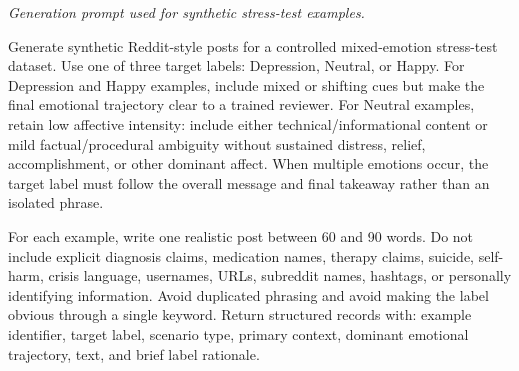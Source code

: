 \documentclass{ieeeaccess}
\begin{document}
\noindent\small\textit{Generation prompt used for synthetic stress-test examples.}\normalsize\par
\smallskip
\noindent
\begingroup\small
Generate synthetic Reddit-style posts for a controlled mixed-emotion stress-test dataset. Use one of three target labels: Depression, Neutral, or Happy. For Depression and Happy examples, include mixed or shifting cues but make the final emotional trajectory clear to a trained reviewer. For Neutral examples, retain low affective intensity: include either technical/informational content or mild factual/procedural ambiguity without sustained distress, relief, accomplishment, or other dominant affect. When multiple emotions occur, the target label must follow the overall message and final takeaway rather than an isolated phrase.
\par\endgroup\medskip
\begingroup\small
For each example, write one realistic post between 60 and 90 words. Do not include explicit diagnosis claims, medication names, therapy claims, suicide, self-harm, crisis language, usernames, URLs, subreddit names, hashtags, or personally identifying information. Avoid duplicated phrasing and avoid making the label obvious through a single keyword. Return structured records with: example identifier, target label, scenario type, primary context, dominant emotional trajectory, text, and brief label rationale.
\par\endgroup

\par\medskip


\clearpage
\end{document}
